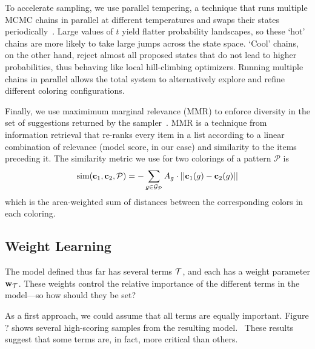 To accelerate sampling, we use parallel tempering, a technique that runs multiple MCMC chains in parallel at different temperatures and swaps their states periodically~\cite{ParallelTempering}. Large values of $t$ yield flatter probability landscapes, so these `hot' chains are more likely to take large jumps across the state space. `Cool' chains, on the other hand, reject almost all proposed states that do not lead to higher probabilities, thus behaving like local hill-climbing optimizers. Running multiple chains in parallel allows the total system to alternatively explore and refine different coloring configurations.

Finally, we use maximimum marginal relevance (MMR) to enforce diversity in the set of suggestions returned by the sampler~\cite{MMR}. MMR is a technique from information retrieval that re-ranks every item in a list according to a linear combination of relevance (model score, in our case) and similarity to the items preceding it. The similarity metric we use for two colorings of a pattern $\mathcal{P}$ is
\begin{equation*}
\text{sim}(\mathbf{c}_1, \mathbf{c}_2, \mathcal{P}) = - \sum_{g \in \mathcal{G}_{\mathcal{P}}} {A_g \cdot ||\mathbf{c}_1(g) - \mathbf{c}_2(g)||}
\end{equation*}
which is the area-weighted sum of \lab distances between the corresponding colors in each coloring.

\subsection{Weight Learning}
\label{sec:weights}

The model defined thus far has several terms $\mathcal{T}$, and each has a weight parameter $\mathbf{w}_{\mathcal{T}}$. These weights control the relative importance of the different terms in the model---so how should they be set?

As a first approach, we could assume that all terms are equally important. Figure ? shows several high-scoring samples from the resulting model.~ These results suggest that some terms are, in fact, more critical than others.

